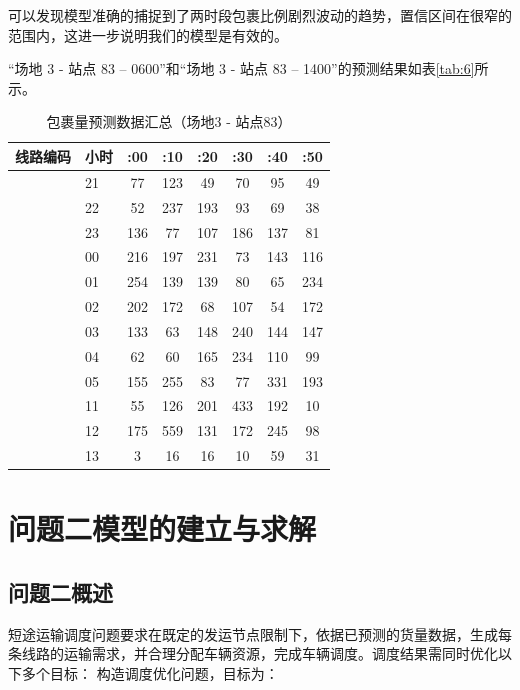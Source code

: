 \documentclass{MMCStyle}
\begin{document}
可以发现模型准确的捕捉到了两时段包裹比例剧烈波动的趋势，置信区间在很窄的范围内，这进一步说明我们的模型是有效的。

“场地 3 - 站点 83 – 0600”和“场地 3 - 站点 83 – 1400”的预测结果如表\ref{tab:6}所示。

\begin{table}[htbp]
\centering
\caption{包裹量预测数据汇总（场地3 - 站点83）}
\label{tab:parcel_forecast}
\footnotesize
\begin{tabular}{@{}llcccccc@{}}
\toprule
\textbf{线路编码} & \textbf{小时} & \textbf{:00} & \textbf{:10} & \textbf{:20} & \textbf{:30} & \textbf{:40} & \textbf{:50} \\
\midrule
{}
& 21 & 77 & 123 & 49 & 70 & 95 & 49 \\
& 22 & 52 & 237 & 193 & 93 & 69 & 38 \\
& 23 & 136 & 77 & 107 & 186 & 137 & 81 \\
& 00 & 216 & 197 & 231 & 73 & 143 & 116 \\
& 01 & 254 & 139 & 139 & 80 & 65 & 234 \\
& 02 & 202 & 172 & 68 & 107 & 54 & 172 \\
& 03 & 133 & 63 & 148 & 240 & 144 & 147 \\
& 04 & 62 & 60 & 165 & 234 & 110 & 99 \\
& 05 & 155 & 255 & 83 & 77 & 331 & 193 \\
\midrule
{}
& 11 & 55 & 126 & 201 & 433 & 192 & 10 \\
& 12 & 175 & 559 & 131 & 172 & 245 & 98 \\
& 13 & 3 & 16 & 16 & 10 & 59 & 31 \\
\bottomrule
\end{tabular}
\end{table}















\section{问题二模型的建立与求解}
\subsection{问题二概述}
短途运输调度问题要求在既定的发运节点限制下，依据已预测的货量数据，生成每条线路的运输需求，并合理分配车辆资源，完成车辆调度。调度结果需同时优化以下多个目标：
构造调度优化问题，目标为：
\end{document}
